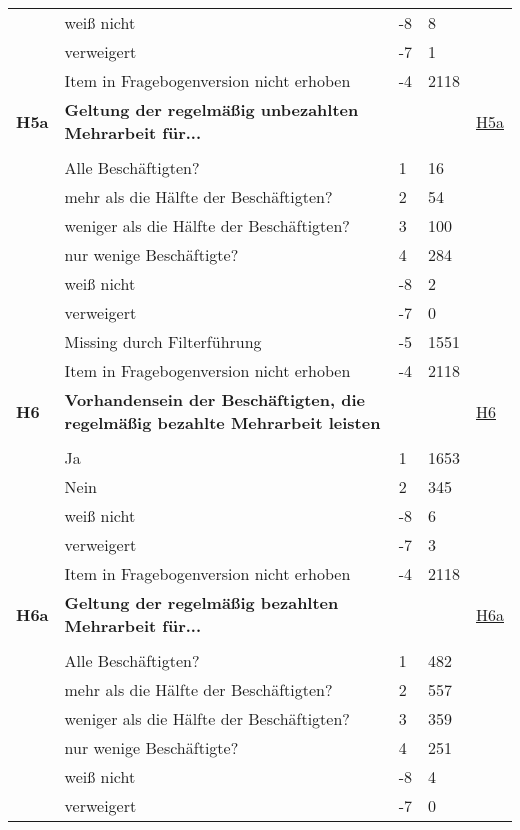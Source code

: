 \begin{longtable}{| L{2.5cm} | L{8.25cm}| C{1.5cm} | R{1.25cm} | C{2.25cm} |  }
   & weiß nicht & -8 & 8 &  \\ 
   & verweigert & -7 & 1 &  \\ 
   & Item in Fragebogenversion nicht erhoben & -4 & 2118 &  \\ 
   \midrule
\textbf{H5a}\label{var:suf:H5a} & \textbf{Geltung der regelmäßig unbezahlten Mehrarbeit für...} &  &  & \hyperref[H5a]{H5a} \\ 
   &  &  &  &  \\ 
   & Alle Beschäftigten? & 1 & 16 &  \\ 
   & mehr als die Hälfte der Beschäftigten? & 2 & 54 &  \\ 
   & weniger als die Hälfte der Beschäftigten? & 3 & 100 &  \\ 
   & nur wenige Beschäftigte? & 4 & 284 &  \\ 
   & weiß nicht & -8 & 2 &  \\ 
   & verweigert & -7 & 0 &  \\ 
   & Missing durch Filterführung & -5 & 1551 &  \\ 
   & Item in Fragebogenversion nicht erhoben & -4 & 2118 &  \\ 
   \midrule
\textbf{H6}\label{var:suf:H6} & \textbf{Vorhandensein der Beschäftigten, die regelmäßig bezahlte Mehrarbeit leisten} &  &  & \hyperref[H6]{H6} \\ 
   &  &  &  &  \\ 
   & Ja & 1 & 1653 &  \\ 
   & Nein & 2 & 345 &  \\ 
   & weiß nicht & -8 & 6 &  \\ 
   & verweigert & -7 & 3 &  \\ 
   & Item in Fragebogenversion nicht erhoben & -4 & 2118 &  \\ 
   \midrule
\textbf{H6a}\label{var:suf:H6a} & \textbf{Geltung der regelmäßig bezahlten Mehrarbeit für...} &  &  & \hyperref[H6a]{H6a} \\ 
   &  &  &  &  \\ 
   & Alle Beschäftigten? & 1 & 482 &  \\ 
   & mehr als die Hälfte der Beschäftigten? & 2 & 557 &  \\ 
   & weniger als die Hälfte der Beschäftigten? & 3 & 359 &  \\ 
   & nur wenige Beschäftigte? & 4 & 251 &  \\ 
   & weiß nicht & -8 & 4 &  \\ 
   & verweigert & -7 & 0 &  \\ 

\end{longtable}

